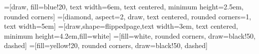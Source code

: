 

  \makeatletter

  =[draw, fill=blue!20, text width=6em, text centered, minimum height=2.5em, rounded corners]
  =[diamond, aspect=2, draw, text centered, rounded
  corners=1, text width=5em]
  =[draw,shape=flippedpage,text width=3em, text centered,
  minimum height=4.2em,fill=white]
  =[fill=white, rounded corners, draw=black!50, dashed]
  =[fill=yellow!20, rounded corners, draw=black!50, dashed]



